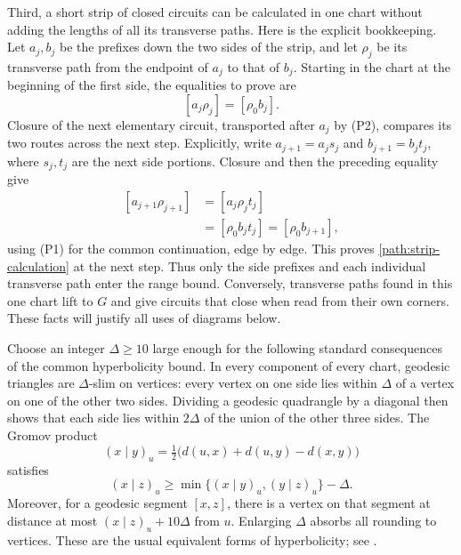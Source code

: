 \documentclass[11pt,reqno]{amsart}
\numberwithin{equation}{section}
\theoremstyle{definition}
\theoremstyle{remark}
\begin{document}
Third, a short strip of closed circuits can be calculated in one chart
without adding the lengths of all its transverse paths.  Here is the
explicit bookkeeping.  Let $a_j,b_j$ be the prefixes down the two sides
of the strip, and let $\rho_j$ be its transverse path from the endpoint
of $a_j$ to that of $b_j$.  Starting in the chart at the beginning of the
first side, the equalities to prove are
\begin{equation}\label{path:strip-calculation}
 [a_j\rho_j]=[\rho_0b_j].
\end{equation}
Closure of the next elementary circuit, transported after $a_j$ by (P2),
compares its two routes across the next step.  Explicitly, write
$a_{j+1}=a_js_j$ and $b_{j+1}=b_jt_j$, where $s_j,t_j$ are the next
side portions.  Closure and then the preceding equality give
\[
 \begin{aligned}
 [a_{j+1}\rho_{j+1}]&=[a_j\rho_jt_j]\\
                    &=[\rho_0b_jt_j]=[\rho_0b_{j+1}],
 \end{aligned}
\]
using (P1) for the common continuation, edge by edge.  This proves
\eqref{path:strip-calculation} at the next step.  Thus only the side
prefixes and each individual transverse path enter the range bound.
Conversely, transverse paths found in this one chart lift to $G$ and
give circuits that close when read from their own corners.  These facts
will justify all uses of diagrams below.

Choose an integer $\Delta\ge10$ large enough for the following standard
consequences of the common hyperbolicity bound.  In every component of
every chart, geodesic triangles are $\Delta$-slim on vertices: every
vertex on one side lies within $\Delta$ of a vertex on one of the other
two sides.  Dividing a geodesic quadrangle by a diagonal then shows that
each side lies within $2\Delta$ of the union of the other three sides.
The Gromov product
\[
 (x\mid y)_u=\tfrac12\bigl(d(u,x)+d(u,y)-d(x,y)\bigr)
\]
satisfies
\begin{equation}\label{path:product}
 (x\mid z)_u\ge
 \min\{(x\mid y)_u,(y\mid z)_u\}-\Delta.
\end{equation}
Moreover, for a geodesic segment $[x,z]$, there is a vertex on that segment
at distance at most $(x\mid z)_u+10\Delta$ from $u$.  Enlarging $\Delta$
absorbs all rounding to vertices.  These are the usual equivalent forms
of hyperbolicity; see \cite[Chapter III.H]{BridsonHaefliger}.
\end{document}
